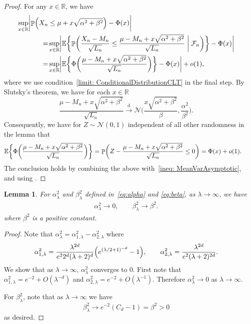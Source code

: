\documentclass[11pt]{article}
\newtheorem{lemma}[thm]{Lemma}
\DeclareMathOperator{\Prob}{\mathbb{P}}
\newcommand{\E}{\mathbb{E}}
\newcommand{\dto}{\xrightarrow{\,\mathrm{d}\,} }
\begin{document}
\begin{proof}
    For any $x \in \mathbb{R}$, we have 
    \begin{align}
        \sup_{x \in \mathbb{R}}\biggl|\Prob\Bigl(X_n & \leq \mu + x \sqrt{\alpha^2 + \beta^2}\Bigr) - \Phi(x)\biggr| \notag \\ 
        =& \sup_{x \in \mathbb{R}}\biggl|\E\biggl\{ \Prob\biggl(\frac{X_n - M_n}{\sqrt{L_n}}\leq \frac{\mu - M_n + x \sqrt{\alpha^2 + \beta^2}}{\sqrt{L_n}} \biggm| \mathcal{F}_n\biggr)\biggr\} - \Phi(x)\biggr| \notag \\
        = & \sup_{x \in \mathbb{R}}\biggl|\E\biggl\{\Phi\biggl(\frac{\mu -M_n + x \sqrt{\alpha^2 + \beta^2}}{\sqrt{L_n}}\biggr)\biggr\}-\Phi(x)\biggr| + o(1) \label{ineq: MeanVarAsymptotic}, 
    \end{align}
    where we use condition~\eqref{limit: ConditionalDistributionCLT} in the  final step. By Slutsky's theorem, we have for each $x\in\mathbb{R}$ 
    \[
    \frac{\mu - M_n + x \sqrt{\alpha^2 + \beta^2} }{\sqrt{ L_n}} \dto \mathcal{N}\biggl(\frac{x \sqrt{\alpha^2 + \beta^2}}{\beta}, \frac{\alpha^2}{\beta^2}\biggr).
    \]
    Consequently, we have for $Z\sim \mathcal{N}(0,1)$ independent of all other randomness in the lemma that
    \begin{align}
        \E\biggl\{\Phi\biggl(\frac{\mu - M_n + x \sqrt{\alpha^2 + \beta^2} }{\sqrt{ L_n}}\biggr)\biggr\} \notag &= \Prob\biggl(Z - \frac{\mu- M_n + x \sqrt{\alpha^2 + \beta^2} }{\sqrt{L_n}} \leq 0\biggr) = \Phi(x) + o(1)\notag.
    \end{align}
    The conclusion holds by combining the above with~\eqref{ineq: MeanVarAsymptotic}, and using \citet[Lemma 3, pp.265]{chow1988probability}.
\end{proof}

\begin{lemma}
\label{lmm:AlphaBetaLambda}
    For $\alpha^2_\lambda$ and $\beta^2_\lambda$ defined in~\eqref{eq:alpha} and \eqref{eq:beta}, as $\lambda\to\infty$, we have
    \begin{align*}
        \alpha_\lambda^2 \to 0, \qquad \beta_\lambda^2 \to \beta^2.
    \end{align*}
    where $\beta^2$ is a positive constant. 
\end{lemma}

\begin{proof}
    Note that $\alpha_\lambda^2 = \alpha^2_{1, \lambda} - \alpha^2_{2, \lambda}$ where 
    \begin{align*}
        \alpha^2_{1, \lambda} = \frac{\lambda^{2d}}{e^2 2^d(\lambda+2)^d}\Bigl(e^{(\lambda/2+1)^{-d}} - 1\Bigr),\qquad \alpha^2_{2, \lambda} = \frac{\lambda^{2d}}{e^2(\lambda+2)^{2d}}.
    \end{align*}
    We show that as $\lambda\to\infty$, $\alpha_\lambda^2$ converges to 0. First note that $\alpha^2_{1, \lambda} = e^{-2} + O(\lambda^{-d})$ and $\alpha^2_{2, \lambda} = e^{-2} + O(\lambda^{-1})$. Therefore $\alpha_\lambda^2\to 0$ as $\lambda\to\infty$.

    For $\beta_\lambda^2$, note that as $\lambda\to\infty$ we have
    \[
        \beta_\lambda^2\rightarrow e^{-2}(C_d - 1) = \beta^2 > 0
    \]
    as desired.
\end{proof}
\end{document}
